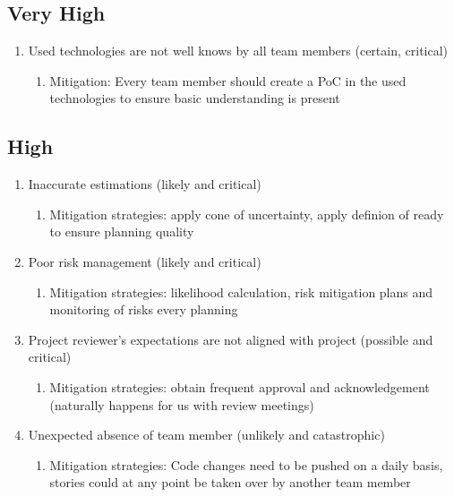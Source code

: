 \subsection{Very High}
\begin{enumerate}
    \item Used technologies are not well knows by all team members (certain, critical) 
    \begin{enumerate}
        \item Mitigation: Every team member should create a PoC in the used technologies to ensure basic understanding is present 
    \end{enumerate}
\end{enumerate}

\subsection{High}
\begin{enumerate}
    \item Inaccurate estimations (likely and critical) 
    \begin{enumerate}
        \item Mitigation strategies: apply cone of uncertainty, apply definion of ready to ensure planning quality 
    \end{enumerate}

    \item Poor risk management (likely and critical)  
    \begin{enumerate}
        \item Mitigation strategies: likelihood calculation, risk mitigation plans and monitoring of risks every planning 
    \end{enumerate}

    \item Project reviewer's expectations are not aligned with project (possible and critical) 
    \begin{enumerate}
        \item Mitigation strategies: obtain frequent approval and acknowledgement (naturally happens for us with review meetings) 
    \end{enumerate}

    \item Unexpected absence of team member (unlikely and catastrophic) 
    \begin{enumerate}
        \item Mitigation strategies: Code changes need to be pushed on a daily basis, stories could at any point be taken over by another team member 
    \end{enumerate}
\end{enumerate}

